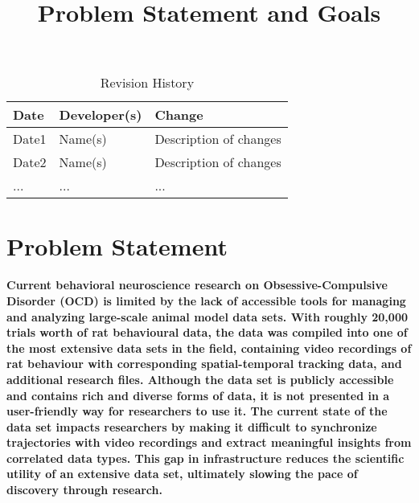 \documentclass{article}
\title{Problem Statement and Goals\\\progname}
\author{\authname}
\date{}
\begin{document}
\maketitle

\begin{table}[hp]
\caption{Revision History} \label{TblRevisionHistory}
\begin{tabularx}{\textwidth}{llX}
\toprule
\textbf{Date} & \textbf{Developer(s)} & \textbf{Change}\\
\midrule
Date1 & Name(s) & Description of changes\\
Date2 & Name(s) & Description of changes\\
... & ... & ...\\
\bottomrule
\end{tabularx}
\end{table}

\section{Problem Statement}

\paragraph{Current behavioral neuroscience research on Obsessive-Compulsive Disorder (OCD) is limited by the lack of accessible tools for managing and analyzing large-scale animal model data sets. With roughly 20,000 trials worth of rat behavioural data, the data was compiled into one of the most extensive data sets in the field, containing video recordings of rat behaviour with corresponding spatial-temporal tracking data, and additional research files. Although the data set is publicly accessible and contains rich and diverse forms of data, it is not presented in a user-friendly way for researchers to use it. The current state of the data set impacts researchers by making it difficult to synchronize trajectories with video recordings and extract meaningful insights from correlated data types. This gap in infrastructure reduces the scientific utility of an extensive data set, ultimately slowing the pace of discovery through research.}


\end{document}
